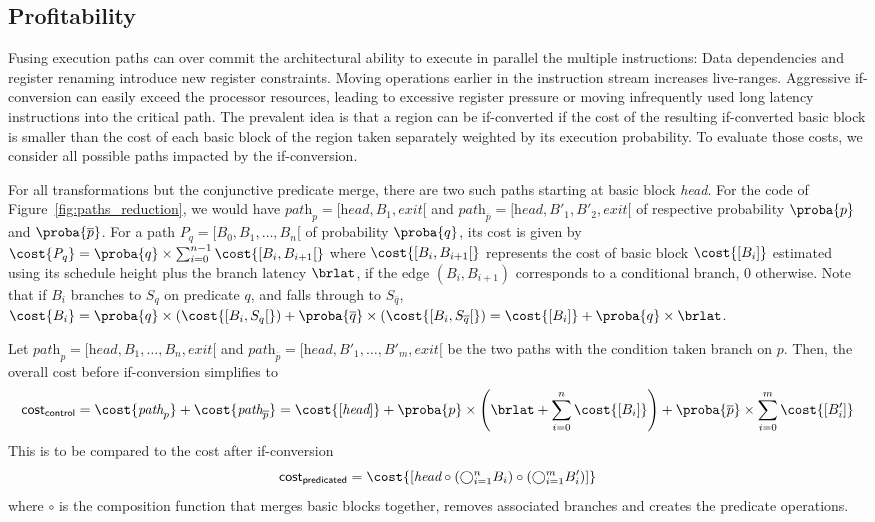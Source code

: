 \subsection{Profitability}

Fusing execution paths can over commit the architectural ability to execute in parallel the multiple instructions: 
Data dependencies and register renaming introduce new register constraints. 
Moving operations earlier in the instruction stream increases live-ranges. 
Aggressive if-conversion can easily exceed the processor resources, leading to excessive register pressure or moving infrequently used long latency instructions into the critical path. 
The prevalent idea is that a region can be if-converted if the cost of the resulting if-converted basic block is smaller than the cost of each basic block of the region taken separately weighted by its execution probability. 
To evaluate those costs, we consider all possible paths impacted by the if-conversion.

For all transformations but the conjunctive predicate merge, there are two such paths starting at basic block \textit{head}. 
For the code of Figure~\ref{fig:paths_reduction}, we would have $\textit{path}_p=[\textit{head}, B_1, \textit{exit}[$ and $\textit{path}_{\overline{p}}=[\textit{head}, B'_1, B'_2, \textit{exit}[$ of respective probability $\proba{p}$ and $\proba{\overline{p}}$. 
For a path $\textit{P}_q=[B_0, B_1, \dots, B_n[$ of probability $\proba{q}$, its cost is given by $\cost{\textit{P}_q}=\proba{q}\times \sum_{i=0}^{n-1} \cost{[B_i,B_{i+1}[}$ where $\cost{[B_i,B_{i+1}[}$ represents the cost of basic block $\cost{[B_i]}$ estimated using its schedule height plus the branch latency $\brlat$, if the edge $(B_i,B_{i+1})$ corresponds to a conditional branch, 0 otherwise. 
Note that if $B_i$ branches to $S_q$ on predicate $q$, and falls through to $S_{\overline{q}}$, $\cost{B_i}=\proba{q}\times \left(\cost{[B_i,S_q[}\right)+\proba{\overline{q}}\times \left(\cost{[B_i,S_{\overline{q}}[}\right)=\cost{[B_i]}+\proba{q}\times\brlat$.

Let $\textit{path}_p=[\textit{head}, B_1, \dots, B_n, \textit{exit}[$ and $\textit{path}_{\overline{p}}=[\textit{head}, B'_1, \dots, B'_m, \textit{exit}[$ be the two paths with the condition taken branch on $p$. 
Then, the overall cost before if-conversion simplifies to
$$\textsf{cost}_{\textsf{control}}=\cost{\textit{path}_p}+\cost{\textit{path}_{\overline{p}}}=\cost{[\textit{head}]} + \proba{p}\times\left(\brlat+\sum_{i=0}^n \cost{[B_i]}\right) + \proba{\overline{p}}\times\sum_{i=0}^m \cost{[B'_i]}$$
This is to be compared to the cost after if-conversion
$$\textsf{cost}_{\textsf{predicated}}=\cost{\left[\textit{head} \circ \left(\bigcirc_{i=1}^n B_i\right)\circ \left(\bigcirc_{i=1}^m B'_i\right)  \right]}$$
where $\circ$ is the composition function that merges basic blocks together, removes associated branches and creates the predicate operations. 

